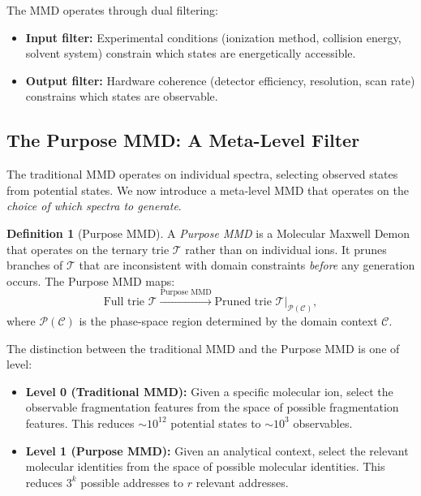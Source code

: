 \documentclass[11pt,twocolumn,a4paper]{article}
\theoremstyle{definition}
\newtheorem{definition}[theorem]{Definition}
\theoremstyle{remark}
\newcommand{\Trie}{\mathcal{T}}
\newcommand{\Purpose}{\mathcal{P}}
\newcommand{\Context}{\mathcal{C}}
\begin{document}
The MMD operates through dual filtering:
\begin{itemize}
  \item \textbf{Input filter:} Experimental conditions (ionization method, collision energy, solvent system) constrain which states are energetically accessible.
  \item \textbf{Output filter:} Hardware coherence (detector efficiency, resolution, scan rate) constrains which states are observable.
\end{itemize}

\subsection{The Purpose MMD: A Meta-Level Filter}\label{sec:purpose-mmd}

The traditional MMD operates on individual spectra, selecting observed states from potential states. We now introduce a meta-level MMD that operates on the \emph{choice of which spectra to generate}.

\begin{definition}[Purpose MMD]\label{def:purpose-mmd}
A \emph{Purpose MMD} is a Molecular Maxwell Demon that operates on the ternary trie $\Trie$ rather than on individual ions. It prunes branches of $\Trie$ that are inconsistent with domain constraints \emph{before} any generation occurs. The Purpose MMD maps:
\begin{equation}\label{eq:purpose-mmd}
  \text{Full trie } \Trie \xrightarrow{\text{Purpose MMD}} \text{Pruned trie } \Trie|_{\Purpose(\Context)},
\end{equation}
where $\Purpose(\Context)$ is the phase-space region determined by the domain context $\Context$.
\end{definition}

The distinction between the traditional MMD and the Purpose MMD is one of level:
\begin{itemize}
  \item \textbf{Level 0 (Traditional MMD):} Given a specific molecular ion, select the observable fragmentation features from the space of possible fragmentation features. This reduces $\sim$$10^{12}$ potential states to $\sim$$10^3$ observables.
  \item \textbf{Level 1 (Purpose MMD):} Given an analytical context, select the relevant molecular identities from the space of possible molecular identities. This reduces $3^k$ possible addresses to $r$ relevant addresses.
\end{itemize}
\end{document}
